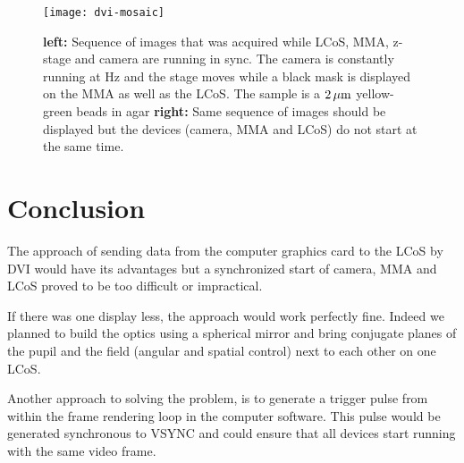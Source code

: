 \begin{figure}[!hbt]
  \centering
  \texttt{[image: dvi-mosaic]}
  \caption{{\bf left:} Sequence of images that was acquired while LCoS,
    MMA, z-stage and camera are running in sync. The camera is
    constantly running at \unit[30]{Hz} and the stage moves while a
    black mask is displayed on the MMA as well as the LCoS. The sample
    is a $\unit[2]{\mu m}$ yellow-green beads in agar {\bf right:}
    Same sequence of images should be displayed but the devices
    (camera, MMA and LCoS) do not start at the same time.}
  \label{fig:dvi-mosaic}
\end{figure}

\section{Conclusion}
The approach of sending data from the computer graphics card to the
LCoS by DVI would have its advantages but a synchronized start of
camera, MMA and LCoS proved to be too difficult or impractical.

If there was one display less, the approach would work perfectly fine.
Indeed we planned to build the optics using a spherical mirror and
bring conjugate planes of the pupil and the field (angular and spatial
control) next to each other on one LCoS.

Another approach to solving the problem, is to generate a trigger
pulse from within the frame rendering loop in the computer
software. This pulse would be generated synchronous to \textsf{VSYNC}
and could ensure that all devices start running with the same video
frame.
